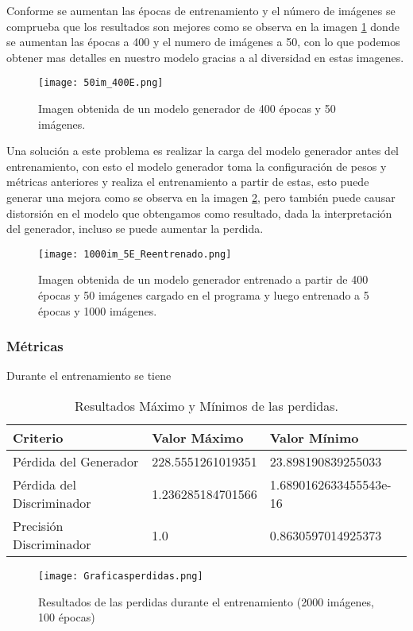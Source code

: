 Conforme se aumentan las épocas de entrenamiento y el número de imágenes se comprueba
que los resultados son mejores como se observa en la imagen \ref{Alexis8} donde se aumentan
las épocas a 400 y el numero de imágenes a 50, con lo que podemos obtener mas detalles en nuestro modelo
gracias a al diversidad en estas imagenes.

\begin{figure}[H]
  \begin{center}
    \texttt{[image: 50im\_400E.png]}
    \caption{Imagen obtenida de un modelo generador de 400 épocas y 50 imágenes.}
    \label{Alexis8}
  \end{center}
\end{figure}

Una solución a este problema es realizar la carga del modelo generador antes del entrenamiento,
con esto el modelo generador toma la configuración de pesos y métricas anteriores y realiza el entrenamiento
a partir de estas, esto puede generar una mejora como se observa en la imagen \ref{Alexis9}, pero
también puede causar distorsión en el modelo que obtengamos como resultado, dada la interpretación del generador,
incluso se puede aumentar la perdida.

\begin{figure}[H]
  \begin{center}
    \texttt{[image: 1000im\_5E\_Reentrenado.png]}
    \caption{Imagen obtenida de un modelo generador entrenado a partir de 400 épocas y 50 imágenes cargado
    en el programa y luego entrenado a 5 épocas y 1000 imágenes.}
    \label{Alexis9}
  \end{center}
\end{figure}




\subsubsection{Métricas}

 Durante el entrenamiento se tiene

 \begin{table}[H]
  \centering
  \caption{Resultados Máximo y Mínimos de las perdidas.}
  \begin{tabular}{|l|l|l|}
  \hline
  \textbf{Criterio} & \textbf{Valor Máximo} & \textbf{Valor Mínimo}  \\ \hline
  Pérdida del Generador           & 228.5551261019351              & 23.898190839255033     \\
  Pérdida del Discriminador       & 1.236285184701566              & 1.6890162633455543e-16  \\
  Precisión Discriminador         & 1.0                            & 0.8630597014925373       \\ \hline
  \end{tabular}
\end{table}



\begin{figure}[H]
  \begin{center}
    \texttt{[image: Graficasperdidas.png]}
    \caption{Resultados de las perdidas durante el entrenamiento (2000 imágenes, 100 épocas)}
    \label{Alexis10}
  \end{center}
\end{figure}